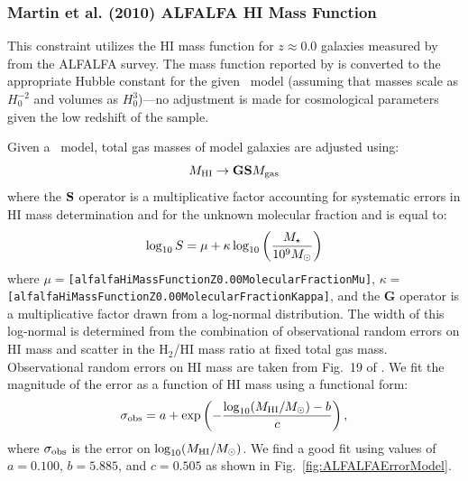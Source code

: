 \subsubsection{Martin et al. (2010) ALFALFA HI Mass Function}\label{sec:AnalysisALFALFAHIMassFunction}

This constraint utilizes the HI mass function for $z\approx 0.0$ galaxies measured by \cite{martin_arecibo_2010} from the ALFALFA survey. The mass function reported by \cite{martin_arecibo_2010} is converted to the appropriate Hubble constant for the given \glc\ model (assuming that masses scale as $H_0^{-2}$ and volumes as $H_0^3$)---no adjustment is made for cosmological parameters given the low redshift of the sample.

Given a \glc\ model, total gas masses of model galaxies are adjusted using:
\begin{equation}
 M_{\rm HI} \rightarrow {\bf G} {\bf S} M_{\rm gas}
\end{equation}
where the ${\bf S}$ operator is a multiplicative factor accounting for systematic errors in HI mass determination and for the unknown molecular fraction and is equal to:
\begin{equation}
 \log_{\rm 10} S = \mu + \kappa \log_{\rm 10} \left({M_\star \over 10^9M_\odot}\right)
\end{equation}
where $\mu=${\tt [alfalfaHiMassFunctionZ0.00MolecularFractionMu]}, $\kappa=${\tt [alfalfaHiMassFunctionZ0.00MolecularFractionKappa]}, and the {\bf G} operator is a multiplicative factor drawn from a log-normal distribution. The width of this log-normal is determined from the combination of observational random errors on HI mass and scatter in the H$_2$/HI mass ratio at fixed total gas mass. Observational random errors on HI mass are taken from Fig.~19 of \cite{haynes_arecibo_2011}. We fit the magnitude of the error as a function of HI mass using a functional form:
\begin{equation}
 \sigma_{\rm obs} = a + \exp\left(-{\log_{10}(M_{\rm HI}/M_\odot)-b\over c}\right),
\end{equation}
where $\sigma_{\rm obs}$ is the error on $\log_{10}(M_{\rm HI}/M_\odot)$. We find a good fit using values of $a=0.100$, $b=5.885$, and $c=0.505$ as shown in Fig.~\ref{fig:ALFALFAErrorModel}. 

